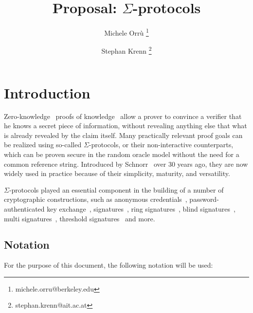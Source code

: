 \documentclass[runningheads,11pt]{article}
\title{Proposal: $\Sigma$-protocols}
\author{Michele Orrù \thanks{michele.orru@berkeley.edu} \and Stephan Krenn
\thanks{stephan.krenn@ait.ac.at}
}
\begin{document}
%
\maketitle              %
%
{\hypersetup{hidelinks} \tableofcontents}

\section{Introduction}

Zero-knowledge~\cite{GolMicRac89} proofs of knowledge~\cite{C:BelGol92} allow a prover to convince a verifier that he knows a secret piece of information, without revealing anything else that what is already revealed by the claim itself.
Many practically relevant proof goals can be realized using so-called $\Sigma$-protocols, or their non-interactive counterparts, which can be proven secure in the random oracle model without the need for a common reference string.
Introduced by Schnorr~\cite{JC:Schnorr91} over 30 years ago, they are now widely used  in practice because of their simplicity, maturity, and versatility.

$\Sigma$-protocols played an essential component in the building of a number of cryptographic
constructions,
such as anonymous credentials~\cite{CCS:ChaMeiZav14}, password-authenticated key exchange~\cite{jpake}, signatures~\cite{C:Schnorr89},
ring signatures~\cite{borromeansig}, blind signatures~\cite{CCS:PoiSte97}, multi signatures~\cite{CCS:NRSW20}, threshold signatures~\cite{EPRINT:KomGol20} and more.
\subsection{Notation}
\label{sec:notation}

For the purpose of this document, the following notation will be used:
\end{document}
